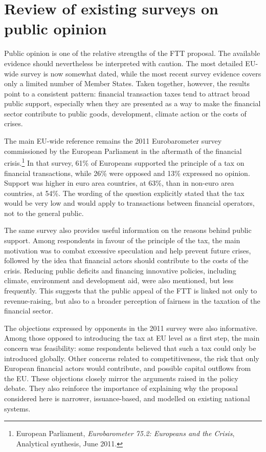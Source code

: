 \documentclass[../../main]{subfiles}
\begin{document}
\section{Review of existing surveys on public opinion}

Public opinion is one of the relative strengths of the FTT proposal. The available evidence should nevertheless be interpreted with caution. The most detailed EU-wide survey is now somewhat dated, while the most recent survey evidence covers only a limited number of Member States. Taken together, however, the results point to a consistent pattern: financial transaction taxes tend to attract broad public support, especially when they are presented as a way to make the financial sector contribute to public goods, development, climate action or the costs of crises.

The main EU-wide reference remains the 2011 Eurobarometer survey commissioned by the European Parliament in the aftermath of the financial crisis.\footnote{European Parliament, \textit{Eurobarometer 75.2: Europeans and the Crisis}, Analytical synthesis, June 2011.} In that survey, 61\% of Europeans supported the principle of a tax on financial transactions, while 26\% were opposed and 13\% expressed no opinion. Support was higher in euro area countries, at 63\%, than in non-euro area countries, at 54\%. The wording of the question explicitly stated that the tax would be very low and would apply to transactions between financial operators, not to the general public.

The same survey also provides useful information on the reasons behind public support. Among respondents in favour of the principle of the tax, the main motivation was to combat excessive speculation and help prevent future crises, followed by the idea that financial actors should contribute to the costs of the crisis. Reducing public deficits and financing innovative policies, including climate, environment and development aid, were also mentioned, but less frequently. This suggests that the public appeal of the FTT is linked not only to revenue-raising, but also to a broader perception of fairness in the taxation of the financial sector.

The objections expressed by opponents in the 2011 survey were also informative. Among those opposed to introducing the tax at EU level as a first step, the main concern was feasibility: some respondents believed that such a tax could only be introduced globally. Other concerns related to competitiveness, the risk that only European financial actors would contribute, and possible capital outflows from the EU. These objections closely mirror the arguments raised in the policy debate. They also reinforce the importance of explaining why the proposal considered here is narrower, issuance-based, and modelled on existing national systems.
\end{document}
